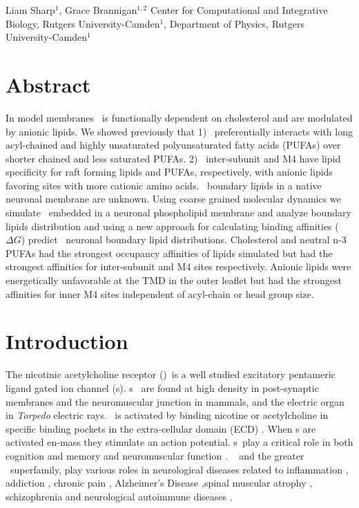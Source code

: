 Liam Sharp$^1$, Grace Brannigan$^{1,2}$
Center for Computational and Integrative Biology, Rutgers University-Camden$^1$, 
Department of Physics, Rutgers University-Camden$^1$\\

\section{Abstract}
In model membranes \nachr~is functionally dependent on cholesterol and are modulated by anionic lipids. We showed previously that 1) \nachr~preferentially interacts with long acyl-chained and highly unsaturated polyunsaturated fatty acids (PUFAs) over shorter chained and less saturated PUFAs. 2) \plgic~inter-subunit and M4 have lipid specificity for raft forming lipids and PUFAs, respectively, with anionic lipids favoring sites with more cationic amino acids.  \nachr~boundary lipids in a native neuronal membrane are unknown. Using coarse grained molecular dynamics we simulate \nachr~embedded in a neuronal phospholipid membrane and analyze boundary lipids distribution and using a new approach for calculating binding affinities ($\Delta G$) predict \nachr~neuronal boundary lipid distributions. Cholesterol and neutral n-3 PUFAs had the strongest occupancy affinities of lipids simulated but had the strongest affinities for inter-subunit and M4 sites respectively. Anionic lipids were energetically unfavorable at the TMD in the outer leaflet but had the strongest affinities for inner M4 sites independent of acyl-chain or head group size. 

\section{Introduction}
\label{Intro}

The nicotinic acetylcholine receptor (\nachr)~is a well studied excitatory pentameric ligand gated ion channel (\plgic s). \nachr s~ are found at high density in post-synaptic membranes and the neuromuscular junction in mammals, and the electric organ in \textit{Torpedo} electric rays. \nachr~is activated by binding nicotine or acetylcholine in specific binding pockets in the extra-cellular domain (ECD) \cite{Dacosta2013,Guros2020}. When \nachr s are activated en-mass they stimulate an action potential. \nachr s~play a critical role in both cognition and memory\cite{Henault2015} and neuromuscular function \cite{Mukhtasimova2016,Kalamida2007}. \nachr~ and the greater \plgic~superfamily, play various roles in neurological diseases related to inflammation \cite{Taly2009,Cornelison2016,Patel2017,Yocum2017,Egea2015},  addiction \cite{Cornelison2016}, chronic pain \cite{Xiong2012}, Alzheimer's Disease \cite{Walstab2010,Picciotto_Neuroprotection_2008,MartinRuiz_4_1999,Kalamida2007},spinal muscular atrophy \cite{Arnold_Reduced_2004}, schizophrenia \cite{Haydar2010,Kalamida2007} and neurological autoimmune diseases \cite{Lennon_Immunization_2003, Kumari2008}.

